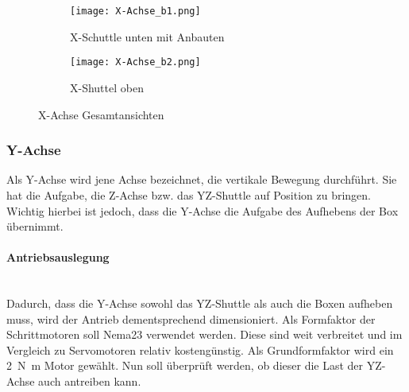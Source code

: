 \begin{figure}[H]
    \centering
    \begin{subfigure}{.5\textwidth}
        \centering
        \texttt{[image: X-Achse\_b1.png]}
        \caption{X-Schuttle unten mit Anbauten}
        \label{X-Achse_b1}
    \end{subfigure}%
    \begin{subfigure}{.5\textwidth}
        \centering
        \texttt{[image: X-Achse\_b2.png]}
        \caption{X-Shuttel oben}
        \label{X-Achse_b2}
    \end{subfigure}
    \caption{X-Achse Gesamtansichten}
    \label{X-Achse_ansichten2}
\end{figure}


\subsubsection{Y-Achse}
Als Y-Achse wird jene Achse bezeichnet, die vertikale Bewegung durchführt. Sie hat die Aufgabe, die Z-Achse bzw. das YZ-Shuttle auf Position zu bringen. Wichtig hierbei ist jedoch, dass die Y-Achse die Aufgabe des Aufhebens der Box übernimmt.

\paragraph{Antriebsauslegung}\mbox{}\\
Dadurch, dass die Y-Achse sowohl das YZ-Shuttle als auch die Boxen aufheben muss, wird der Antrieb dementsprechend dimensioniert. Als Formfaktor der Schrittmotoren soll Nema23 verwendet werden. Diese sind weit verbreitet und im Vergleich zu Servomotoren relativ kostengünstig. Als Grundformfaktor wird ein \SI{2}{\newton\meter} Motor gewählt. Nun soll überprüft werden, ob dieser die Last der YZ-Achse auch antreiben kann.

